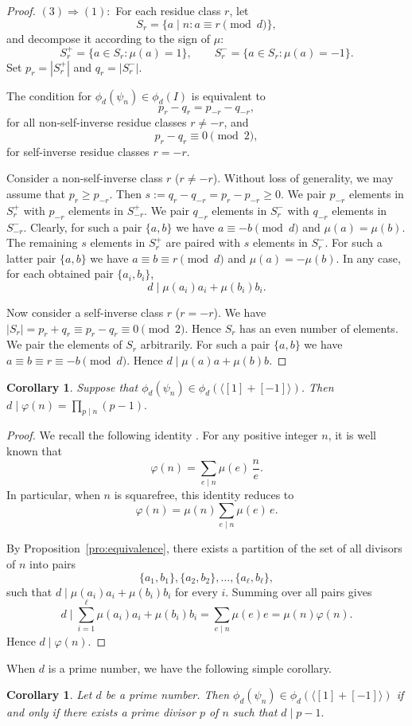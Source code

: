 \documentclass[12t,a4paper]{amsart}
\newtheorem{cor}[thm]{Corollary}
\theoremstyle{definition}
\numberwithin{equation}{section}
\begin{document}
{\begin{proof}
$(3)\Rightarrow (1):$
For each residue class $r$, let
\[
S_r=\{a\mid n : a\equiv r\pmod d\},
\]
and decompose it according to the sign of $\mu$:
\[
S_r^{+}=\{a\in S_r : \mu(a)=1\}, 
\qquad
S_r^{-}=\{a\in S_r : \mu(a)=-1\}.
\]
Set $p_r = |S_r^{+}|$ and $q_r = |S_r^{-}|$.  

The condition for $\phi_d(\psi_n)\in \phi_d(I)$ is equivalent to 
\[
p_r - q_r = p_{-r} - q_{-r},
\]
 for all non-self-inverse residue classes $r\not=-r$, and
\[
p_r - q_r\equiv 0\pmod 2,
\]
for self-inverse residue classes $r=-r$.


Consider a non-self-inverse class $r$ ($r\not=-r$).
Without loss of generality, we may assume that $p_r \geq p_{-r}$. 
Then $s:=q_r-q_{-r}=p_{r}-p_{-r}\geq0$. We pair $p_{-r}$ elements in $S_r^+$ with $p_{-r}$ elements in $S_{-r}^+$.
We pair $q_{-r}$ elements in $S_r^-$ with $q_{-r}$ elements in $S_{-r}^-$. Clearly, for such a pair $\{a,b\}$ we have $a\equiv -b\pmod d$ and $\mu(a)=\mu(b)$. 
The remaining $s$ elements in $S_r^{+}$ are paired with $s$ elements in $S_{r}^{-}$. For such a latter pair $\{a,b\}$ we have $a\equiv b\equiv r\pmod d$ and $\mu(a)=-\mu(b)$. In any case, for each  obtained pair $\{a_i,b_i\}$, 
\[
d \mid \mu(a_i)a_i+\mu(b_i)b_i.
\]

Now consider a self-inverse class $r$ ($r=-r$). We have $|S_r|=p_r+q_r\equiv p_r-q_r\equiv 0\pmod 2$. Hence $S_r$ has an even number of elements. We pair the elements of $S_r$ arbitrarily.  For such a pair $\{a,b\}$ we have $a\equiv b\equiv r\equiv -b\pmod d$. Hence $d\mid \mu(a)a+\mu(b)b$.
\end{proof}
\begin{cor}
Suppose that $\phi_d(\psi_n)\in \phi_d(\langle[1]+[-1]\rangle)$. Then  $d \mid \varphi(n)= \prod_{p \mid n}(p-1).$
\end{cor}
\begin{proof}
We recall the following identity \cite[Pg.~81, (4.5)]{hyde2019polynomial}. For any positive integer $n$, it is well known that
\[
\varphi(n) = \sum_{e \mid n} \mu(e)\,\frac{n}{e}.
\]
In particular, when $n$ is squarefree, this identity reduces to
\[
\varphi(n) = \mu(n) \sum_{e \mid n} \mu(e)\, e.
\]


    By Proposition~\ref{pro:equivalence}, there exists a partition of  the set of all divisors of $n$ into pairs 
        \[
\{a_1,b_1\},\{a_2,b_2\},\ldots,\{a_\ell,b_\ell\}, \] 
such that $d\mid \mu(a_i)a_i+\mu(b_i)b_i$ for every $i$. Summing over all pairs gives
\[d\mid \sum_{i=1}^\ell  \mu(a_i)a_i+\mu(b_i)b_i = \sum_{e\mid n} \mu(e)e=\mu(n)\varphi(n).\]
 Hence $d\mid\varphi(n)$.
\end{proof}
{When $d$ is a prime number, we have the following simple corollary. 
\begin{cor} \label{cor:d-prime}
    Let $d$ be a prime number. Then $\phi_d(\psi_n)\in \phi_d(\langle [1] + [-1] \rangle)$ if and only if there exists a prime divisor $p$ of $n$ such that $d \mid p-1.$
\end{cor}

}}
\end{document}
